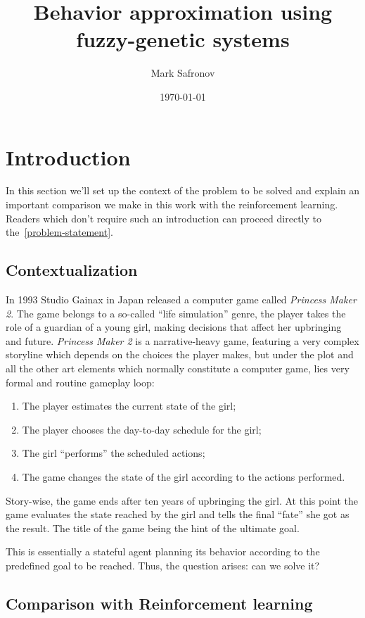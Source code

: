 \documentclass[11pt, a4paper]{article}
\title{Behavior approximation using fuzzy-genetic systems}
\author{Mark Safronov}
\date{\today}
\begin{document}
	
	
	
	\tableofcontents
	
	\section{Introduction}
	
	In this section we'll set up the context of the problem to be solved and explain an important comparison we make in this work with the reinforcement learning.
	Readers which don't require such an introduction can proceed directly to the~\ref{problem-statement}.
	
	\subsection{Contextualization}

	In 1993 Studio Gainax in Japan released a computer game called \textit{Princess Maker 2}.
	The game belongs to a so-called ``life simulation'' genre, the player takes the role of a guardian of a young girl, making decisions that affect her upbringing and future.
	\textit{Princess Maker 2} is a narrative-heavy game, featuring a very complex storyline which depends on the choices the player makes, but under the plot and all the other art elements which normally constitute a computer game, lies very formal and routine gameplay loop:
	
	\begin{enumerate}
		\item The player estimates the current state of the girl;
		\item The player chooses the day-to-day schedule for the girl;
		\item The girl ``performs'' the scheduled actions;
		\item The game changes the state of the girl according to the actions performed.
	\end{enumerate}
	
	Story-wise, the game ends after ten years of upbringing the girl.
	At this point the game evaluates the state reached by the girl and tells the final ``fate'' she got as the result.
	The title of the game being the hint of the ultimate goal.
		
	This is essentially a stateful agent planning its behavior according to the predefined goal to be reached.
	Thus, the question arises: can we solve it?

	\subsection{Comparison with Reinforcement learning}
\end{document}
